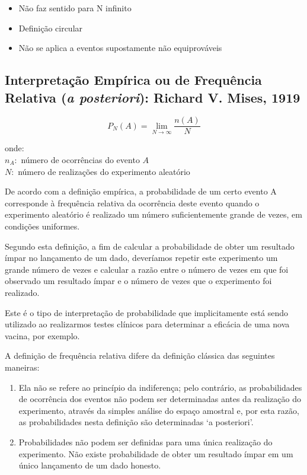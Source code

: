 \documentclass[
]{book}
\providecommand{\tightlist}{%
  \setlength{\itemsep}{0pt}\setlength{\parskip}{0pt}}
\theoremstyle{definition}
\theoremstyle{definition}
\theoremstyle{definition}
\theoremstyle{remark}
\begin{document}
\begin{itemize}
\tightlist
\item
  Não faz sentido para N infinito\\
\item
  Definição circular\\
\item
  Não se aplica a eventos supostamente não equiprováveis
\end{itemize}

\hypertarget{interpretauxe7uxe3o-empuxedrica-ou-de-frequuxeancia-relativa-a-posteriori-richard-v.-mises-1919}{%
\subsection*{\texorpdfstring{Interpretação Empírica ou de Frequência Relativa (\emph{a posteriori}): Richard V. Mises, 1919}{Interpretação Empírica ou de Frequência Relativa (a posteriori): Richard V. Mises, 1919}}\label{interpretauxe7uxe3o-empuxedrica-ou-de-frequuxeancia-relativa-a-posteriori-richard-v.-mises-1919}}

\[P_N(A) = \lim_{N\to\infty}\frac{n(A)}{N}\]

onde:\\
\(n_A:\) número de ocorrências do evento \(A\)\\
\(N:\) número de realizações do experimento aleatório

De acordo com a definição empírica, a probabilidade de um certo evento A corresponde à frequência relativa da ocorrência deste evento quando o experimento aleatório é realizado um número suficientemente grande de vezes, em condições uniformes.

Segundo esta definição, a fim de calcular a probabilidade de obter um resultado ímpar no lançamento de um dado, deveríamos repetir este experimento um grande número de vezes e calcular a razão entre o número de vezes em que foi observado um resultado ímpar e o número de vezes que o experimento foi realizado.

Este é o tipo de interpretação de probabilidade que implicitamente está sendo utilizado ao realizarmos testes clínicos para determinar a eficácia de uma nova vacina, por exemplo.

A definição de frequência relativa difere da definição clássica das seguintes maneiras:

\begin{enumerate}
\def\labelenumi{\roman{enumi}.}
\item
  Ela não se refere ao princípio da indiferença; pelo contrário, as probabilidades de ocorrência dos eventos não podem ser determinadas antes da realização do experimento, através da simples análise do espaço amostral e, por esta razão, as probabilidades nesta definição são determinadas `a posteriori'.
\item
  Probabilidades não podem ser definidas para uma única realização do experimento. Não existe probabilidade de obter um resultado ímpar em um único lançamento de um dado honesto.
\end{enumerate}
\end{document}
